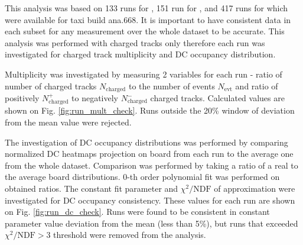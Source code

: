This analysis was based on 133 runs for \HeAu, 151 run for \pAl, and 417 runs for \pAu which were available for taxi build ana.668. 
It is important to have consistent data in each subset for any measurement over the whole dataset to be accurate. 
This analysis was performed with charged tracks only therefore each run was investigated for charged track multiplicity and DC occupancy distribution.

Multiplicity was investigated by measuring 2 variables for each run - ratio of number of charged tracks $N_{\text{charged}}$ to the number of events $N_{\text{evt}}$ and ratio of positively $N_{\text{charged}}^+$ to negatively $N_{\text{charged}}^-$ charged tracks. 
Calculated values are shown on Fig. \ref{fig:run_mult_check}. 
Runs outside the 20\% window of deviation from the mean value were rejected.

The investigation of DC occupancy distributions was performed by comparing normalized DC heatmaps projection on board from each run to the average one from the whole dataset.
Comparison was performed by taking a ratio of a real to the average board distributions. 
0-th order polynomial fit was performed on obtained ratios. 
The constant fit parameter and $\chi^2/\text{NDF}$ of approximation were investigated for DC occupancy consistency.
These values for each run are shown on Fig. \ref{fig:run_dc_check}.
Runs were found to be consistent in constant parameter value deviation from the mean (less than 5\%), but runs that exceeded $\chi^2/\text{NDF} > 3$ threshold were removed from the analysis.
